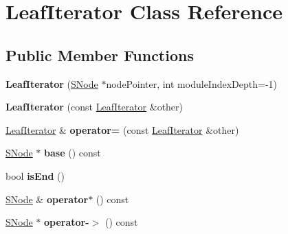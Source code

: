 \hypertarget{classLeafIterator}{}\section{Leaf\+Iterator Class Reference}
\label{classLeafIterator}
\subsection*{Public Member Functions}
\begin{DoxyCompactItemize}
\item 
\mbox{\label{classLeafIterator_a5a30609354d85dc5463328ef874dd37a}} 
{\bfseries Leaf\+Iterator} (\mbox{\hyperlink{classSNode}{S\+Node}} $\ast$node\+Pointer, int module\+Index\+Depth=-\/1)
\item 
\mbox{\label{classLeafIterator_ab085f4165bd9529d4c70863de8b4b7f7}} 
{\bfseries Leaf\+Iterator} (const \mbox{\hyperlink{classLeafIterator}{Leaf\+Iterator}} \&other)
\item 
\mbox{\label{classLeafIterator_aa315758b55bf8aaa7d140b5c2a4c11cf}} 
\mbox{\hyperlink{classLeafIterator}{Leaf\+Iterator}} \& {\bfseries operator=} (const \mbox{\hyperlink{classLeafIterator}{Leaf\+Iterator}} \&other)
\item 
\mbox{\label{classLeafIterator_a26a85bbc1200ed03ec85bc07d0700af2}} 
\mbox{\hyperlink{classSNode}{S\+Node}} $\ast$ {\bfseries base} () const
\item 
\mbox{\label{classLeafIterator_a22f7c8d4acbc4dadf088ecc5c4da7fd7}} 
bool {\bfseries is\+End} ()
\item 
\mbox{\label{classLeafIterator_a3642b237e9176e37ed65bd5324a1a4b6}} 
\mbox{\hyperlink{classSNode}{S\+Node}} \& {\bfseries operator$\ast$} () const
\item 
\mbox{\label{classLeafIterator_afb1abe83dc5377b39ec22c4df976121f}} 
\mbox{\hyperlink{classSNode}{S\+Node}} $\ast$ {\bfseries operator-\/$>$} () const
\item 
\mbox{\label{classLeafIterator_ae09655faa6f272e364f16365e411b137}} 

\end{DoxyCompactItemize}
